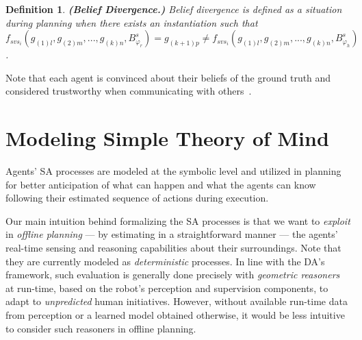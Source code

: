 \documentclass[letterpaper]{article} %
\newtheorem{definition}{Definition}
\begin{document}
\begin{definition} \label{def:bd}
\textbf{(Belief Divergence.)}
Belief divergence is defined as a situation during planning when there exists an instantiation such that 
$f_{\textit{svs}_i}(g_{(1)l},g_{(2)m},...,g_{(k)n},B_{\varphi_r}^s) = {g_{(k+1)p}}  \neq f_{\textit{svs}_i}(g_{(1)l},g_{(2)m},...,g_{(k)n},B_{\varphi_h}^s)$.
\end{definition} 

Note that each agent is convinced about their beliefs of the ground truth and considered trustworthy when communicating with others~\cite{fabiano2021multi}.

\section{Modeling Simple Theory of Mind} \label{sec:model-tom}
Agents' SA processes are modeled at the symbolic level and utilized in planning for better anticipation of what can happen and what the agents can know following their estimated sequence of actions during execution. 


Our main intuition behind formalizing the SA processes is that we want to \textit{exploit} in \textit{offline planning} --- by estimating in a straightforward manner --- the agents' real-time sensing and reasoning capabilities about their surroundings. 
Note that they are currently modeled as \textit{deterministic} processes. 
In line with the DA's framework, such evaluation is generally done precisely with \textit{geometric reasoners} at run-time, based on the robot's perception and supervision components, to adapt to \textit{unpredicted} human initiatives. 
However, without available run-time data from perception or a learned model obtained otherwise, it would be less intuitive to consider such reasoners in offline planning.
\end{document}
